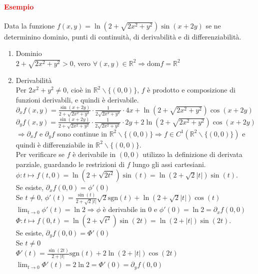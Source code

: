 \documentclass{article}
\newcommand{\R}{\mathbb{R}}
\newcommand{\sgn}{\text{sgn}}
\newcommand{\dom}{\text{dom}}
\begin{document}
\paragraph{\textcolor{red}{Esempio}}
Data la funzione $f(x,y)=\ln(2+\sqrt{2x^2+y^2})\sin(x+2y)$ se ne determinino dominio, punti di continuità, di derivabilità e di differenziabilità.
\begin{enumerate}
    \item Dominio\\
    $2+\sqrt{2x^2+y^2}>0$, vero $\forall(x,y)\in\R^2 \Rightarrow \dom f =\R^2$
    \item Derivabilità\\
    Per $2x^2+y^2\neq 0$, cioè in $\R^2\backslash\{(0,0)\}$, $f$ è prodotto e composizione di funzioni derivabili, e quindi è derivabile.\\
    $\partial_x f(x,y)=\frac{\sin(x+2y)}{2+\sqrt{2x^2+y^2}}\cdot \frac{1}{2\sqrt{2x^2+y^2}}\cdot4x+\ln(2+\sqrt{2x^2+y^2})\cos(x+2y)$\\
    $\partial_yf(x,y)=\frac{\sin(x+2y)}{2+\sqrt{2x^2+y^2}}\cdot\frac{1}{2\sqrt{2x^2+y^2}}\cdot 2y+2\ln(2+\sqrt{2x^2+y^2})\cos(x+2y)$\\
    $\Rightarrow \partial_x f$ e $\partial_y f$ sono continue in $\R^2\backslash\{(0,0)\} \Rightarrow f \in C^1(\R^2\backslash\{(0,0)\})$ e quindi è differenziabile in $\R^2\backslash\{(0,0)\}$.\\
    Per verificare se $f$ è derivabile in $(0,0)$ utilizzo la definizione di derivata parziale, guardando le restrizioni di $f$ lungo gli assi cartesiani.\\
    $\phi: t \mapsto f(t,0)=\ln(2+\sqrt{2t^2})\sin(t)= \ln(2+\sqrt{2}|t|)\sin(t)$.\\
    Se esiste, $\partial_x f(0,0)=\phi'(0)$\\
    Se $t\neq 0$, $\phi'(t)=\frac{\sin(t)}{2+\sqrt{2}|t|}\sqrt{2}\sgn(t)+\ln(2+\sqrt{2}|t|)\cos(t)$\\
    $\lim_{t \rightarrow0} \phi'(t)=\ln 2 \Rightarrow \phi$ è derivabile in $0$ e $\phi'(0)=\ln 2=\partial_x f(0,0)$\\
    $\Phi: t \mapsto f(0,t)=\ln(2+\sqrt{t^2})\sin(2t)=\ln(2+|t|)\sin(2t)$.\\
    Se esiste, $\partial_y f(0,0)=\Phi'(0)$\\
    Se $t \neq 0$\\
    $\Phi'(t)=\frac{\sin(2t)}{2+|t|}\sgn (t)+2\ln(2+|t|)\cos(2t)$\\
    $\lim_{t\rightarrow0}\Phi'(t)=2\ln 2=\Phi'(0)=\partial_y f(0,0)$\\

\end{enumerate}
\end{document}

